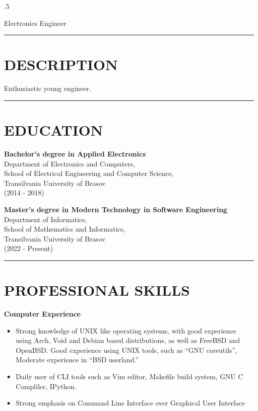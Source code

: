 \documentclass{resume}
\begin{document}
 
\thispagestyle{empty} %
\address{Str. Stefan Baciu, Nr. 67, Brasov, Romania\\  
  \it{luchiann.mihai@gmail.com}\\  
  +40 (0731) 757 891}

\begin{resume}
\vspace{0.1in}
\moveleft.5\sectionwidth\centerline{Electronics Engineer}  

\noindent\rule{\textwidth}{0.4pt}
\section{DESCRIPTION}
\vspace{0.1in} 
 
    Enthusiastic young engineer.

\noindent\rule{\textwidth}{0.4pt}
\section{EDUCATION}
\vspace{0.1in} 
 
    {\bf Bachelor's degree in Applied Electronics}\\ 
    Department of Electronics and Computers,\\ 
    School of Electrical Engineering and Computer Science,\\ 
    Transilvania University of Brasov\\
    (2014 - 2018)

    {\bf Master's degree in Modern Technology in Software Engineering}\\
    Department of Informatics,\\
    School of Mathematics and Informatics,\\
    Transilvania University of Brasov\\
    (2022 - Present)
 
\noindent\rule{\textwidth}{0.4pt}
\section{PROFESSIONAL SKILLS} 
\vspace{0.1in}
   {\bf Computer Experience} 
        \begin{itemize}
        \item[] Strong knowledge of UNIX like operating systems, 
        with good experience using Arch, Void and Debian based distributions, as well as FreeBSD and OpenBSD.
        Good experience using UNIX tools, such as ``GNU coreutils'',
        Moderate experience in ``BSD userland.''
        \item[] Daily user of CLI tools such as Vim editor, Makefile build system, GNU C Compliler, IPython. 
        \item[] Strong emphasis on Command Line Interface over Graphical User Interface
        \end{itemize}
        

\end{resume}
\end{document}
